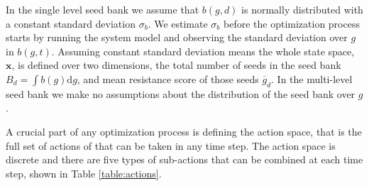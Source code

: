 \documentclass[12pt, a4paper]{article}
\begin{document}
In the single level seed bank we assume that $b(g, d)$ is normally distributed with a constant standard deviation $\sigma_b$. We estimate $\sigma_b$ before the optimization process starts by running the system model and observing the standard deviation over $g$ in $b(g, t)$. Assuming constant standard deviation means the whole state space, $\mathbf{x}$, is defined over two dimensions, the total number of seeds in the seed bank $B_d = \int b(g)\text{d}g$, and mean resistance score of those seeds $\overline{g}_d$. In the multi-level seed bank we make no assumptions about the distribution of the seed bank over $g$.   

A crucial part of any optimization process is defining the action space, that is the full set of actions of that can be taken in any time step. The action space is discrete and there are five types of sub-actions that can be combined at each time step, shown in Table \ref{table:actions}. 
\end{document}
